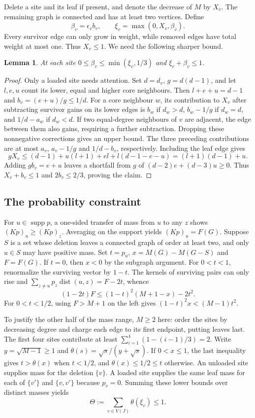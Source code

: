 \documentclass[11pt,a4paper]{article}
\newtheorem{lemma}[theorem]{Lemma}
\theoremstyle{remark}\newtheorem*{remark}{Remark}
\newcommand{\supp}{\operatorname{supp}}
\DeclareMathOperator{\dist}{dist}
\begin{document}
Delete a site and its leaf if present, and denote the decrease of $M$ by $X_v$. The remaining graph is connected and has at least two vertices. Define
\[
 \beta_v=\epsilon_v b_v,\qquad \xi_v=\max(0,X_v,\beta_v).
\]
Every survivor edge can only grow in weight, while removed edges have total weight at most one. Thus $X_v\le1$. We need the following sharper bound.
\begin{lemma}\label{local}
At each site $0\le\beta_v\le\min(\xi_v,1/3)$ and $\xi_v+\beta_v\le1$.
\end{lemma}
\begin{proof}
Only a loaded site needs attention. Set $d=d_v$, $g=d(d-1)$, and let $l,e,u$ count its lower, equal and higher core neighbours. Then $l+e+u=d-1$ and $b_v=(e+u)/g\le1/d$. For a core neighbour $w$, its contribution to $X_v$ after subtracting survivor gains on its lower edges is $b_w$ if $d_w>d$, $b_w-1/g$ if $d_w=d$, and $1/d-a_w$ if $d_w<d$. If two equal-degree neighbours of $v$ are adjacent, the edge between them also gains, requiring a further subtraction. Dropping these nonnegative corrections gives an upper bound. The three preceding contributions are at most $a_v$, $a_v-1/g$ and $1/d-b_v$, respectively. Including the leaf edge gives
\[
 g X_v\le(d-1)+u(l+1)+el+l(d-1-e-u)=(l+1)(d-1)+u.
\]
Adding $gb_v=e+u$ leaves a shortfall from $g$ of $(d-2)e+(d-3)u\ge0$. Thus $X_v+b_v\le1$ and $2b_v\le2/3$, proving the claim.
\end{proof}
\subsection{The probability constraint}
For $u\in\supp p$, a one-sided transfer of mass from $u$ to any $z$ shows $(Kp)_u\ge(Kp)_z$. Averaging on the support yields $(Kp)_u=F(G)$. Suppose $S$ is a set whose deletion leaves a connected graph of order at least two, and only $u\in S$ may have positive mass. Set $t=p_u$, $x=M(G)-M(G-S)$ and $F=F(G)$. If $t=0$, then $x<0$ by the subgraph argument. For $0<t<1$, renormalize the surviving vector by $1-t$. The kernels of surviving pairs can only rise and $\sum_{z\ne u}p_z\dist(u,z)=F-2t$, whence
\[
 (1-2t)F\le (1-t)^2(M+1-x)-2t^2 .
\]
For $0<t<1/2$, using $F>M+1$ on the left gives $(1-t)^2x<(M-1)t^2$.

To justify the other half of the mass range, $M\ge2$ here: order the sites by decreasing degree and charge each edge to its first endpoint, putting leaves last. The first four sites contribute at least $\sum_{i=1}^4(1-(i-1)/3)=2$. Write $y=\sqrt{M-1}\ge1$ and $\theta(s)=\sqrt s/(y+\sqrt s)$. If $0<x\le1$, the last inequality gives $t>\theta(x)$ when $t<1/2$, and $\theta(x)\le1/2\le t$ otherwise. An unloaded site supplies mass for the deletion $\{v\}$. A loaded site supplies the same leaf mass for each of $\{v'\}$ and $\{v,v'\}$ because $p_v=0$. Summing these lower bounds over distinct masses yields
\begin{equation}
 \Theta:=\sum_{v\in V(J)}\theta(\xi_v)\le1.\label{budget}
\end{equation}
\end{document}

